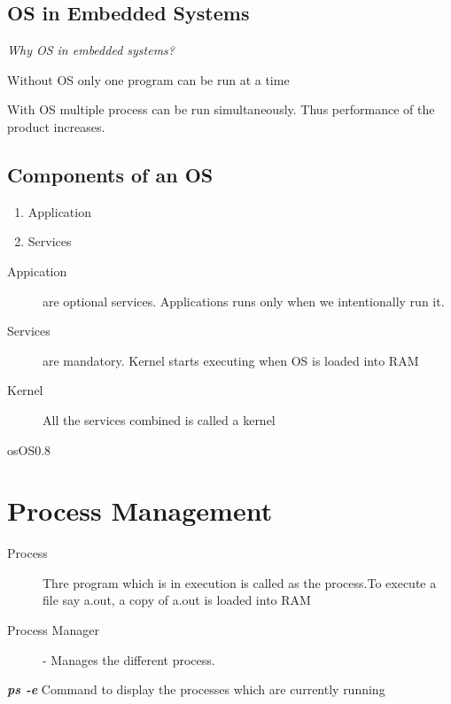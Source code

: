 \documentclass[11pt,fleqn]{book} %
\begin{document}
\section{OS in Embedded Systems}
\textit{Why OS in embedded systems?}

Without OS only one program can be run at a time

With OS multiple process can be run simultaneously. Thus performance of the product increases.

\section{Components of an OS}
\begin{enumerate}
	\item Application
	\item Services
\end{enumerate}

\begin{description}
 \item[Appication] are optional services. Applications runs only when we intentionally run it. 
 \item[Services] are mandatory. Kernel starts executing when OS is loaded into RAM 
 \item[Kernel] All the services combined is called a kernel
\end{description}

\begin{myfigure}{os}{OS}{0.8}
\end{myfigure}

\chapter{Process Management}

\begin{description}
	\item [Process] Thre program which is in execution is called as the process.To execute a file say a.out, a copy of a.out is loaded into RAM
	\item [Process Manager] - Manages the different process. 
\end{description}


\begin{myremark}{}
\textit{\textbf{ps -e}} Command to display the processes which are currently running
\end{myremark}
\end{document}
